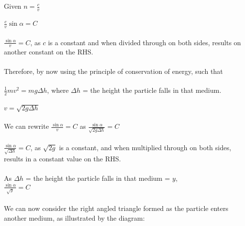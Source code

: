 \documentclass[12pt]{report}
\begin{document}
\\
\\
Given \(n=\frac{c}{v}\)
\\
\\
\implies \(\frac{c}{v}\sin{\alpha} = C\)
\\
\\
\implies \(\frac{\sin{\alpha}}{v} = C\), as \(c\) is a constant and when divided through on both sides, results on another constant on the RHS.
\\
\\
Therefore, by now using the principle of conservation of energy, such that
\\
\\
\(\frac{1}{2}mv^2 = mg\Delta h\), where \(\Delta h\) = the height the particle falls in that medium.
\\
\\
\implies \(v = \sqrt{2g\Delta h}\)
\\
\\
We can rewrite \(\frac{\sin{\alpha}}{v} = C\) as \(\frac{\sin{\alpha}}{\sqrt{2g\Delta h}} = C\)
\\
\\
\implies \(\frac{\sin{\alpha}}{\sqrt{\Delta h}} = C\), as \(\sqrt{2g}\) is a constant, and when multiplied through on both sides, results in a constant value on the RHS.
\\
\\
As \(\Delta h\) = the height the particle falls in that medium = \(y\),
\\
\implies \(\frac{\sin{\alpha}}{\sqrt{y}} = C\)
\\
\\
We can now consider the right angled triangle formed as the particle enters another medium, as illustrated by the diagram:
\\
\\
\usetikzlibrary{decorations.pathreplacing}
\end{document}
